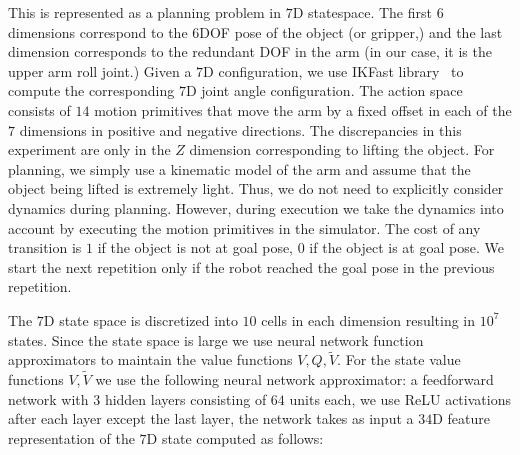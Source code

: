 This is represented as a planning problem in $7$D statespace. The
first $6$ dimensions correspond to the $6$DOF pose of the object (or
gripper,) and the last dimension corresponds to the redundant DOF in
the arm (in our case, it is the upper arm roll joint.) Given a $7$D
configuration, we use IKFast library~\cite{diankov_thesis} to compute
the corresponding $7$D joint angle configuration. The action space
consists of $14$ motion primitives that move the arm by a fixed offset
in each of the $7$ dimensions in positive and negative directions. The
discrepancies in this experiment are only in the $Z$ dimension
corresponding to lifting the object. For planning, we simply use a
kinematic model of the arm and assume that the object being lifted is
extremely light. Thus, we do not need to explicitly consider dynamics
during planning. However, during execution we take the dynamics into
account by executing the motion primitives in the simulator. The cost
of any transition is $1$ if the object is not at goal pose, $0$ if the
object is at goal pose. We start the next repetition only if the robot
reached the goal pose in the previous repetition.


The $7$D state space is discretized into $10$ cells in each dimension
resulting in $10^7$ states. Since the state space is large we use
neural network function approximators to maintain the value functions
$V, Q, \tilde{V}$. For the state value functions $V, \tilde{V}$ we use
the following neural network approximator: a feedforward network with
$3$ hidden layers consisting of $64$ units each, we use ReLU
activations after each layer except the last layer, the network takes
as input a $34$D feature representation of the $7$D state computed as
follows:

